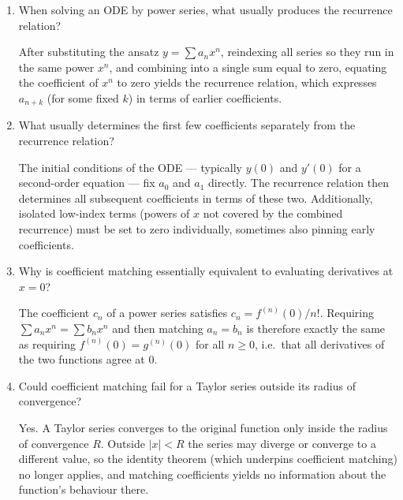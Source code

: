 \documentclass{self-check}
\begin{document}
\begin{enumerate}[leftmargin=*, itemsep=8pt]
  \item When solving an ODE by power series, what usually produces
    the recurrence relation?
    \begin{answer}
      After substituting the ansatz $y = \sum a_n x^n$, reindexing
      all series so they
      run in the same power $x^n$, and combining into a single sum
      equal to zero,
      equating the coefficient of $x^n$ to zero yields the recurrence
      relation, which
      expresses $a_{n+k}$ (for some fixed $k$) in terms of earlier coefficients.
    \end{answer}

  \item What usually determines the first few coefficients separately
    from the recurrence relation?
    \begin{answer}
      The initial conditions of the ODE --- typically $y(0)$ and $y'(0)$ for a
      second-order equation --- fix $a_0$ and $a_1$ directly. The recurrence
      relation then determines all subsequent coefficients in terms
      of these two.
      Additionally, isolated low-index terms (powers of $x$ not covered by the
      combined recurrence) must be set to zero individually,
      sometimes also pinning
      early coefficients.
    \end{answer}

  \item Why is coefficient matching essentially equivalent to
    evaluating derivatives at \(x=0\)?
    \begin{answer}
      The coefficient $c_n$ of a power series satisfies $c_n = f^{(n)}(0)/n!$.
      Requiring $\sum a_n x^n = \sum b_n x^n$ and then matching $a_n = b_n$ is
      therefore exactly the same as requiring $f^{(n)}(0) = g^{(n)}(0)$ for all
      $n \ge 0$, i.e.\ that all derivatives of the two functions agree at $0$.
    \end{answer}

  \item Could coefficient matching fail for a Taylor series outside
    its radius of convergence?
    \begin{answer} Yes. A Taylor series converges to the original
      function only inside the radius of convergence $R$. Outside
      $|x| < R$ the series may diverge or converge to a different
      value, so the identity theorem (which underpins coefficient
      matching) no longer applies, and matching coefficients yields
      no information about the function's behaviour there.
    \end{answer}


\end{enumerate}
\end{document}
